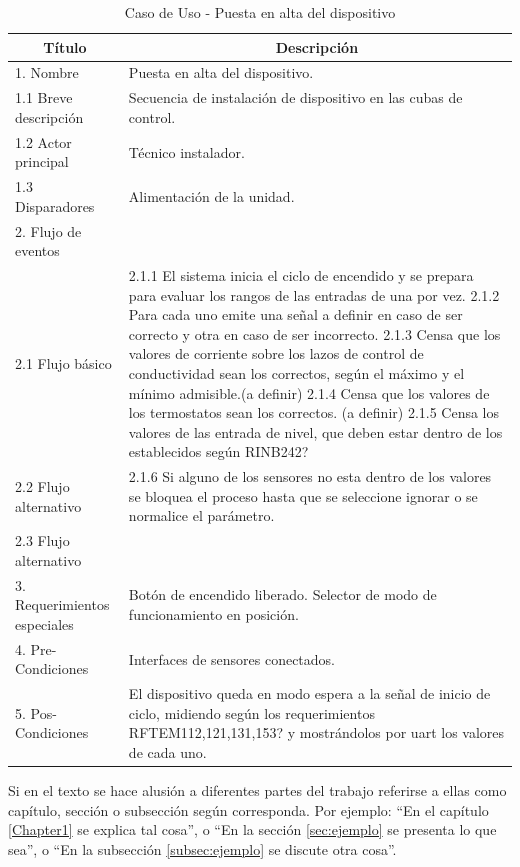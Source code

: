 \begin{table}[h]
\centering
\begin{tabular}{|m{10em}|m{25em}|}
\hline
\multicolumn{1}{|c|}{\textbf{Título}} & \multicolumn{1}{c|}{\textbf{Descripción}} \\ \hline
	1. Nombre & Puesta en alta del dispositivo. \\ \hline
	1.1 Breve descripción  & Secuencia de instalación de dispositivo en las cubas de control. \\ \hline
	1.2 Actor principal  & Técnico instalador. \\ \hline
	1.3 Disparadores  & Alimentación de la unidad. \\ \hline
	2. Flujo de eventos &  \\ \hline
	2.1 Flujo básico & 2.1.1  El sistema inicia el ciclo de encendido y se prepara para evaluar los rangos de las entradas de una por vez. 
	2.1.2  Para cada uno emite una señal a definir en caso de ser correcto y otra en caso de ser incorrecto. 
	2.1.3  Censa que los valores de corriente sobre los lazos de control de conductividad sean los correctos, según el máximo y el mínimo admisible.(a definir) 
	2.1.4  Censa que los valores de los termostatos sean los correctos. (a definir)
	2.1.5  Censa los valores de las entrada de nivel, que deben estar dentro de los establecidos según RINB242? \\ \hline
	2.2 Flujo alternativo  & 2.1.6 Si alguno de los sensores no esta dentro de los valores se bloquea el proceso hasta que se seleccione ignorar o se normalice el parámetro.  \\ \hline
	2.3 Flujo alternativo  &  \\ \hline
	3. Requerimientos especiales & Botón de encendido liberado. Selector de modo de funcionamiento en posición. \\ \hline
	4. Pre-Condiciones  & Interfaces de sensores conectados.  \\ \hline
	5. Pos-Condiciones & El dispositivo queda en modo espera a la señal de inicio de ciclo, midiendo según los requerimientos RFTEM112,121,131,153? y mostrándolos por uart los valores de cada uno. \\ \hline
\end{tabular}
\caption{Caso de Uso - Puesta en alta del dispositivo}
\label{casos_uso_alta}
\end{table}


Si en el texto se hace alusión a diferentes partes del trabajo referirse a ellas como capítulo, sección o subsección según corresponda. Por ejemplo: ``En el capítulo \ref{Chapter1} se explica tal cosa'', o ``En la sección \ref{sec:ejemplo} se presenta lo que sea'', o ``En la subsección \ref{subsec:ejemplo} se discute otra cosa''.


